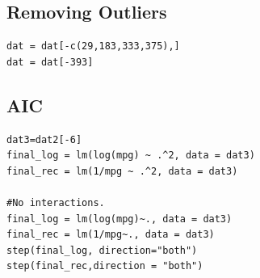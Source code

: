 \documentclass[11pt]{article} %
\begin{document}
\subsection{Removing Outliers}
\begin{lstlisting}
dat = dat[-c(29,183,333,375),]
dat = dat[-393]
\end{lstlisting}

\subsection{AIC}

\begin{lstlisting}
dat3=dat2[-6]
final_log = lm(log(mpg) ~ .^2, data = dat3)
final_rec = lm(1/mpg ~ .^2, data = dat3)

#No interactions.
final_log = lm(log(mpg)~., data = dat3)
final_rec = lm(1/mpg~., data = dat3)
step(final_log, direction="both")
step(final_rec,direction = "both")
\end{lstlisting}
\end{document}
